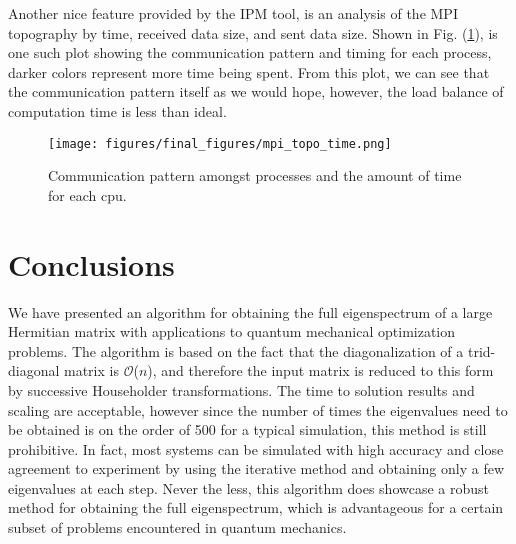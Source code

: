 \documentclass[twocolumn]{article}
\begin{document}
Another nice feature provided by the IPM tool, is an analysis of the MPI topography by time, received data size, and sent data size.  Shown in Fig. (\ref{fig:mpitopo}), is one such plot showing the communication pattern and timing for each process, darker colors represent more time being spent.  From this plot, we can see that the communication pattern itself as we would hope, however, the load balance of computation time is less than ideal.
\vspace{-.1cm}
\begin{figure}[ht]
\texttt{[image: figures/final\_figures/mpi\_topo\_time.png]}
\caption{Communication pattern amongst processes and the amount of time for each cpu.}
\label{fig:mpitopo}
\end{figure}


\section{Conclusions}
We have presented an algorithm for obtaining the full eigenspectrum of a large Hermitian matrix with applications to quantum mechanical optimization problems.  The algorithm is based on the fact that the diagonalization of a trid-diagonal matrix is $\mathcal{O}$($n$), and therefore the input matrix is reduced to this form by successive Householder transformations.  The time to solution results and scaling are acceptable, however since the number of times the eigenvalues need to be obtained is on the order of 500 for a typical simulation, this method is still prohibitive.  In fact, most systems can be simulated with high accuracy and close agreement to experiment by using the iterative method and obtaining only a few eigenvalues at each step.  Never the less, this algorithm does showcase a robust method for obtaining the full eigenspectrum, which is advantageous for a certain subset of problems encountered in quantum mechanics.
\end{document}
